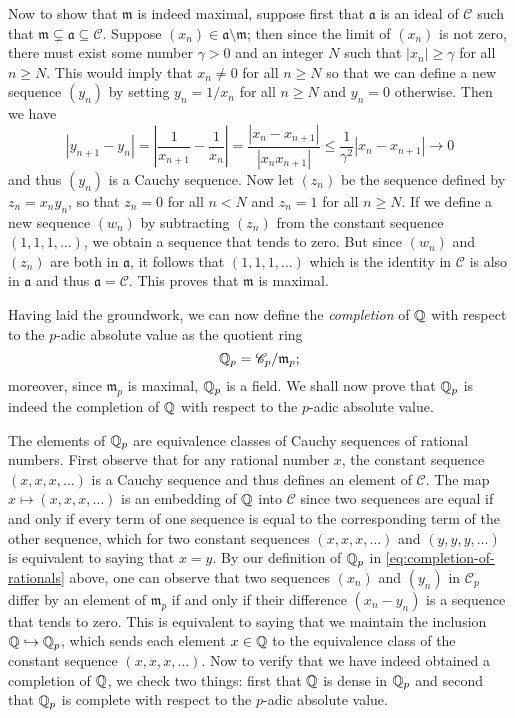 Now to show that \(\mathfrak{m}\) is indeed maximal, suppose first that
\(\mathfrak{a}\) is an ideal of \(\mathscr{C}\) such that \(\mathfrak{m}
\subsetneq \mathfrak{a} \subseteq \mathscr{C}\). Suppose \((x_n) \in
\mathfrak{a} \setminus \mathfrak{m}\); then since the limit of \((x_n)\) is not
zero, there must exist some number \(\gamma > 0\) and an integer \(N\) such that
\(|x_n| \geq \gamma\) for all \(n \geq N\). This would imply that \(x_n \neq 0\)
for all \(n \geq N\) so that we can define a new sequence \((y_n)\) by setting
\(y_n = 1/x_n\) for all \(n \geq N\) and \(y_n = 0\) otherwise. Then we have
\[
    |y_{n+1} - y_n| = \left|\frac{1}{x_{n+1}} - \frac{1}{x_n}\right| = \frac{|x_n - x_{n+1}|}{|x_nx_{n+1}|} \leq \frac{1}{\gamma^2}|x_n - x_{n+1}| \to 0
\]
and thus \((y_n)\) is a Cauchy sequence. Now let \((z_n)\) be the sequence
defined by \(z_n = x_ny_n\), so that \(z_n = 0\) for all \(n < N\) and \(z_n =
1\) for all \(n \geq N\). If we define a new sequence \((w_n)\) by subtracting
\((z_n)\) from the constant sequence \((1, 1, 1, \dots)\), we obtain a sequence
that tends to zero. But since \((w_n)\) and \((z_n)\) are both in
\(\mathfrak{a}\), it follows that \((1, 1, 1, \dots)\) which is the identity in
\(\mathscr{C}\) is also in \(\mathfrak{a}\) and thus \(\mathfrak{a} =
\mathscr{C}\). This proves that \(\mathfrak{m}\) is maximal.

Having laid the groundwork, we can now define the \emph{completion} of
\(\mathbb{Q}\) with respect to the \(p\)-adic absolute value as the quotient
ring
\begin{equation}\label{eq:completion-of-rationals}
    \mathbb{Q}_p = \mathscr{C}_p / \mathfrak{m}_p;
\end{equation}
moreover, since \(\mathfrak{m}_p\) is maximal, \(\mathbb{Q}_p\) is a field. We
shall now prove that \(\mathbb{Q}_p\) is indeed the completion of \(\mathbb{Q}\)
with respect to the \(p\)-adic absolute value.

The elements of \(\mathbb{Q}_p\) are equivalence classes of Cauchy sequences of
rational numbers. First observe that for any rational number \(x\), the constant
sequence \((x, x, x, \dots)\) is a Cauchy sequence and thus defines an element
of \(\mathscr{C}\). The map \(x \mapsto (x, x, x, \dots)\) is an embedding of
\(\mathbb{Q}\) into \(\mathscr{C}\) since two sequences are equal if and only if
every term of one sequence is equal to the corresponding term of the other
sequence, which for two constant sequences \((x, x, x, \dots)\) and \((y, y, y,
\dots)\) is equivalent to saying that \(x = y\). By our definition of
\(\mathbb{Q}_p\) in \eqref{eq:completion-of-rationals} above, one can observe
that two sequences \((x_n)\) and \((y_n)\) in \(\mathscr{C}_p\) differ by an
element of \(\mathfrak{m}_p\) if and only if their difference \((x_n - y_n)\) is
a sequence that tends to zero. This is equivalent to saying that we maintain the
inclusion \(\mathbb{Q} \hookrightarrow \mathbb{Q}_p\), which sends each element
\(x \in \mathbb{Q}\) to the equivalence class of the constant sequence \((x, x,
x, \dots)\). Now to verify that we have indeed obtained a completion of
\(\mathbb{Q}\), we check two things: first that \(\mathbb{Q}\) is dense in
\(\mathbb{Q}_p\) and second that \(\mathbb{Q}_p\) is complete with respect to
the \(p\)-adic absolute value.

